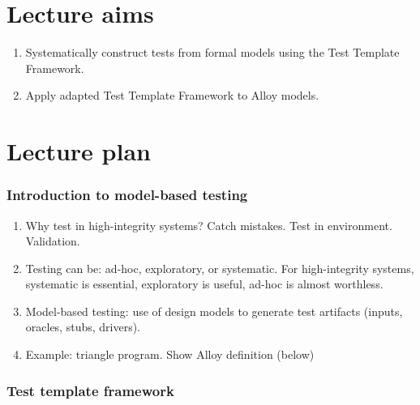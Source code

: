 \documentclass[11pt]{article}
\begin{document}
\section*{Lecture aims}

 \begin{enumerate}


 \item Systematically construct tests from formal models using the Test Template Framework.

 \item Apply adapted Test Template Framework to Alloy models.

\end{enumerate}

\section*{Lecture plan}
  
\subsubsection*{Introduction to model-based testing}

\begin{enumerate}

 \item Why test in high-integrity systems? Catch mistakes. Test in environment. Validation.

 \item Testing can be: ad-hoc, exploratory, or systematic. For high-integrity systems, systematic is essential, exploratory is useful, ad-hoc is almost worthless.

 \item Model-based testing: use of design models to generate test artifacts (inputs, oracles, stubs, drivers).

 \item Example: triangle program. Show Alloy definition (below)

\end{enumerate}

\subsubsection*{Test template framework}
\end{document}
